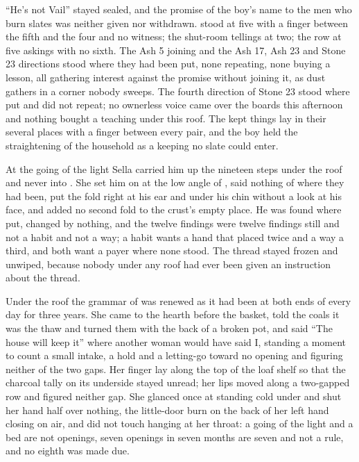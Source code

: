 “He's not Vail” stayed sealed, and the promise of the boy's name to the men who burn slates was neither given nor withdrawn.  stood at five with a finger between the fifth and the four and no witness; the shut-room tellings at two; the row at five askings with no sixth. The Ash 5 joining and the Ash 17, Ash 23 and Stone 23 directions stood where they had been put, none repeating, none buying a lesson, all gathering interest against the promise without joining it, as dust gathers in a corner nobody sweeps. The fourth direction of Stone 23 stood where put and did not repeat; no ownerless voice came over the boards this afternoon and nothing bought a teaching under this roof. The kept things lay in their several places with a finger between every pair, and the boy held the straightening of the household as a keeping no slate could enter.

\scenebreak

At the going of the light Sella carried him up the nineteen steps under the roof and never into . She set him on  at the low angle of , said nothing of where they had been, put the fold right at his ear and under his chin without a look at his face, and added no second fold to the crust's empty place. He was found where put, changed by nothing, and the twelve findings were twelve findings still and not a habit and not a way; a habit wants a hand that placed twice and a way a third, and both want a payer where none stood. The thread stayed frozen and unwiped, because nobody under any roof had ever been given an instruction about the thread.

Under the roof the grammar of  was renewed as it had been at both ends of every day for three years. She came to the hearth before the basket, told the coals it was the thaw and turned them with the back of a broken pot, and said “The house will keep it” where another woman would have said I, standing a moment to count a small intake, a hold and a letting-go toward no opening and figuring neither of the two gaps. Her finger lay along the top of the loaf shelf so that the charcoal tally on its underside stayed unread; her lips moved along a two-gapped row and figured neither gap. She glanced once at  standing cold under  and shut her hand half over nothing, the little-door burn on the back of her left hand closing on air, and did not touch  hanging at her throat: a going of the light and a bed are not openings, seven openings in seven months are seven and not a rule, and no eighth was made due.

